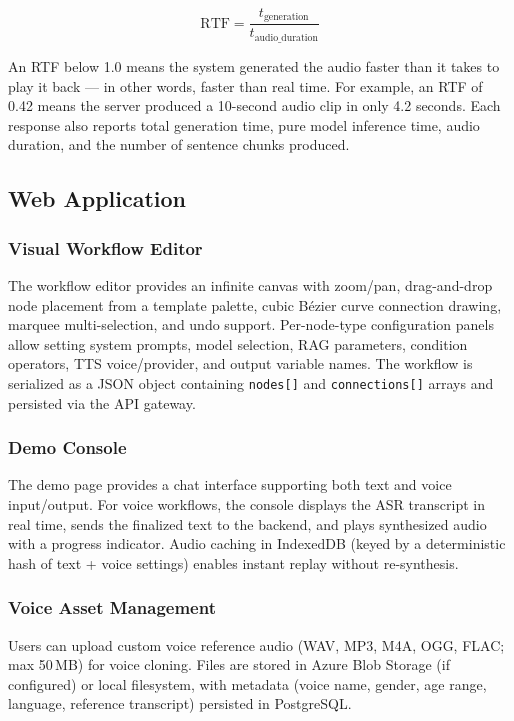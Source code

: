 \documentclass[10pt, a4paper, twocolumn]{article}
\begin{document}
\begin{equation}
    \text{RTF} = \frac{t_\text{generation}}{t_\text{audio\_duration}}
    \label{eq:rtf}
\end{equation}

\noindent An RTF below 1.0 means the system generated the audio faster
than it takes to play it back --- in other words, faster than real time.
For example, an RTF of 0.42 means the server produced a 10-second audio
clip in only 4.2 seconds.
Each response also reports total generation time, pure model inference
time, audio duration, and the number of sentence chunks produced.
\subsection{Web Application}

\subsubsection{Visual Workflow Editor}
The workflow editor provides an infinite canvas with zoom/pan, drag-and-drop node placement from a template palette, cubic B\'{e}zier curve connection drawing, marquee multi-selection, and undo support.
Per-node-type configuration panels allow setting system prompts, model selection, RAG parameters, condition operators, TTS voice/provider, and output variable names.
The workflow is serialized as a JSON object containing \texttt{nodes[]} and \texttt{connections[]} arrays and persisted via the API gateway.

\subsubsection{Demo Console}
The demo page provides a chat interface supporting both text and voice input/output.
For voice workflows, the console displays the ASR transcript in real time, sends the finalized text to the backend, and plays synthesized audio with a progress indicator.
Audio caching in IndexedDB (keyed by a deterministic hash of text + voice settings) enables instant replay without re-synthesis.

\subsubsection{Voice Asset Management}
Users can upload custom voice reference audio (WAV, MP3, M4A, OGG, FLAC; max 50\,MB) for voice cloning.
Files are stored in Azure Blob Storage (if configured) or local filesystem, with metadata (voice name, gender, age range, language, reference transcript) persisted in PostgreSQL.
\end{document}
